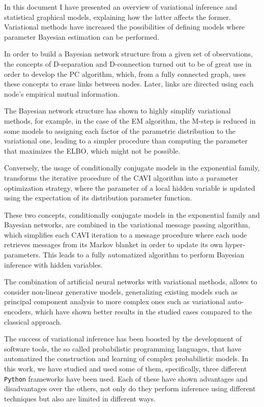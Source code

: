 

In this document I have presented an overview of variational inference and statistical graphical models, explaining how the latter affects the former. Variational methods have increased the possibilities of defining models where parameter Bayesian estimation can be performed.

In order to build a Bayesian network structure from a given set of observations, the concepts of D-separation and D-connection turned out to be of great use in order to develop the PC algorithm, which, from a fully connected graph, uses these concepts to erase links between nodes. Later, links are directed using each node's empirical mutual information.

The Bayesian network structure has shown to highly simplify variational methods, for example, in the case of the EM algorithm, the M-step is reduced in some models to assigning each factor of the parametric distribution to the variational one, leading to a simpler procedure than computing the parameter that maximizes the ELBO, which might not be possible.

Conversely, the usage of conditionally conjugate models in the exponential family, transforms the iterative procedure of the CAVI algorithm into a parameter optimization strategy, where the parameter of a local hidden variable is updated using the expectation of its distribution parameter function.

These two concepts, conditionally conjugate models in the exponential family and Bayesian networks, are combined in the variational message passing algorithm, which simplifies each CAVI iteration to a message procedure where each node retrieves messages from its Markov blanket in order to update its own hyper-parameters. This leads to a fully automatized algorithm to perform Bayesian inference with hidden variables.

The combination of artificial neural networks with variational methods, allows to consider non-linear generative models, generalizing existing models such as principal component analysis to more complex ones such as variational auto-encoders, which have shown better results in the studied cases compared to the classical approach.

The success of variational inference has been boosted by the development of software tools, the so called probabilistic programming languages, that have automatized the construction and learning of complex probabilistic models. In this work, we have studied and used some of them, specifically, three different \texttt{Python} frameworks have been used. Each of these have shown advantages and disadvantages over the others, not only do they perform inference using different techniques but also are limited in different ways.

